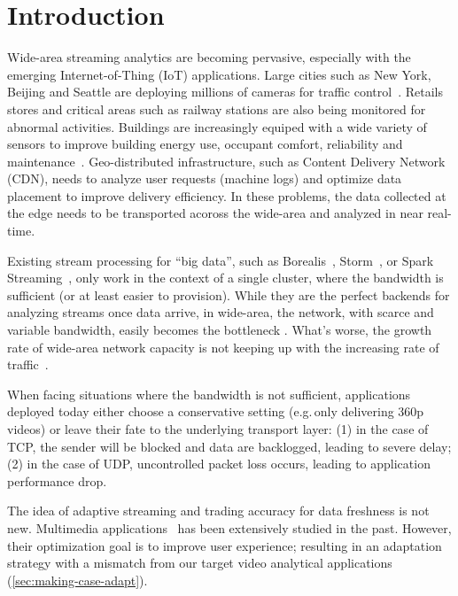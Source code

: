 \section{Introduction}
\label{sec:introduction}

Wide-area streaming analytics are becoming pervasive, especially with the
emerging Internet-of-Thing (IoT) applications. Large cities such as New York,
Beijing and Seattle are deploying millions of cameras for traffic
control~\cite{london.surveillance,skynet}. Retails stores and critical areas
such as railway stations are also being monitored for abnormal
activities. Buildings are increasingly equiped with a wide variety of sensors to
improve building energy use, occupant comfort, reliability and
maintenance~\cite{krioukov2012building}. Geo-distributed infrastructure, such as
Content Delivery Network (CDN), needs to analyze user requests (machine logs)
and optimize data placement to improve delivery efficiency. In these problems,
the data collected at the edge needs to be transported acoross the wide-area and
analyzed in near real-time.

Existing stream processing for ``big data'', such as
Borealis~\cite{abadi2005design}, Storm~\cite{toshniwal2014storm}, or Spark
Streaming~\cite{zaharia2012discretized}, only work in the context of a single
cluster, where the bandwidth is sufficient (or at least easier to
provision). While they are the perfect backends for analyzing streams once data
arrive, in wide-area, the network, with scarce and variable bandwidth, easily
becomes the bottleneck \cite{rabkin2014aggregation}. What's worse, the growth
rate of wide-area network capacity is not keeping up with the increasing rate of
traffic~\cite{index2013zettabyte}.

When facing situations where the bandwidth is not sufficient, applications
deployed today either choose a conservative setting (e.g.\,only delivering 360p
videos) or leave their fate to the underlying transport layer: (1) in the case
of TCP, the sender will be blocked and data are backlogged, leading to severe
delay; (2) in the case of UDP, uncontrolled packet loss occurs, leading to
application performance drop.

The idea of adaptive streaming and trading accuracy for data freshness is not
new. Multimedia applications~\cite{michalos2012dynamic, schulzrinne1998real} has
been extensively studied in the past. However, their optimization goal is to
improve user experience; resulting in an adaptation strategy with a mismatch
from our target video analytical applications (\autoref{sec:making-case-adapt}).

